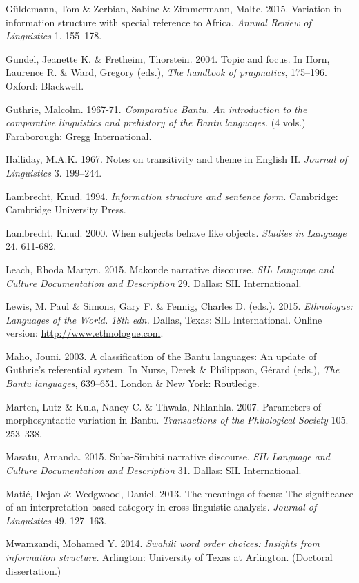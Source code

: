 \documentclass[output=paper]{langsci/langscibook}
\begin{document}
\begin{styleLangSciTranslation}
\begin{styleLangSciTranslation}
\begin{styleLangSciTranslation}
Güldemann, Tom \& Zerbian, Sabine \& Zimmermann, Malte. 2015. Variation in information structure with special reference to Africa. \textit{Annual Review of Linguistics} 1. 155–178.

Gundel, Jeanette K. \& Fretheim, Thorstein. 2004. Topic and focus. In Horn, Laurence R. \& Ward, Gregory (eds.), \textit{The handbook of pragmatics}, 175–196. Oxford: Blackwell.

Guthrie, Malcolm. 1967-71. \textit{Comparative Bantu. An introduction to the comparative linguistics and prehistory of the Bantu languages.} (4 vols.) Farnborough: Gregg International.

Halliday, M.A.K. 1967. Notes on transitivity and theme in English II. \textit{Journal of Linguistics} 3. 199–244.

Lambrecht, Knud. 1994. \textit{Information structure and sentence form. }Cambridge: Cambridge University Press.

Lambrecht, Knud. 2000. When subjects behave like objects. \textit{Studies }\textit{in Language} 24. 611-682.

Leach, Rhoda Martyn. 2015. Makonde narrative discourse. \textit{SIL Language and Culture Documentation and Description} 29. Dallas: SIL International.

Lewis, M. Paul \& Simons, Gary F. \& Fennig, Charles D. (eds.). 2015. \emph{Ethnologue: Languages}\emph{ of the World. }\emph{18}\emph{th}\emph{ edn. }Dallas, Texas: SIL International. Online version: \href{http://www.ethnologue.com/}{http://www.ethnologue.com}.

Maho, Jouni. 2003. A classification of the Bantu languages: An update of Guthrie’s referential system. In Nurse, Derek \& Philippson, Gérard (eds.), \textit{The Bantu languages}, 639–651. London \& New York: Routledge.

Marten, Lutz \& Kula, Nancy C. \& Thwala, Nhlanhla. 2007. Parameters of morphosyntactic variation in Bantu. \textit{Transactions of the Philological Society} 105. 253–338.

Masatu, Amanda. 2015. Suba-Simbiti narrative discourse. \textit{SIL Language and }\textit{Culture Documentation and Description} 31. Dallas: SIL International.

Matić, Dejan \& Wedgwood, Daniel. 2013. The meanings of focus: The significance of an interpretation-based category in cross-linguistic analysis. \textit{Journal of Linguistics} 49. 127–163.

Mwamzandi, Mohamed Y. 2014. \textit{Swahili word order choices: Insights from information structure.} Arlington: University of Texas at Arlington. (Doctoral dissertation.)


\end{styleLangSciTranslation}
\end{styleLangSciTranslation}
\end{styleLangSciTranslation}
\end{document}

